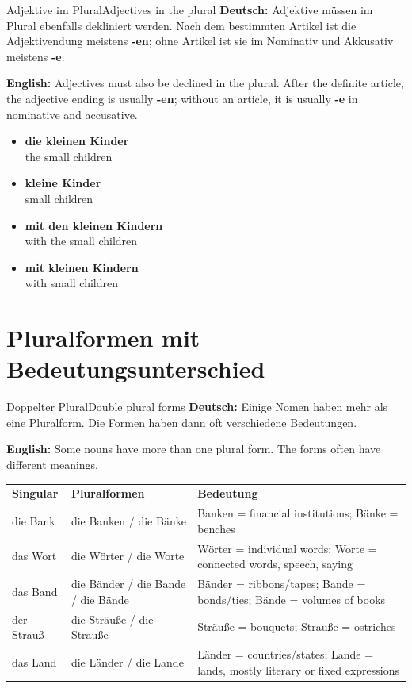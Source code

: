 \documentclass[a4paper,11pt]{article}
\newcommand{\GermanText}[1]{\textbf{Deutsch: }#1\par}
\newcommand{\EnglishText}[1]{{\small\color{SoftGray}\textbf{English: }#1\par}}
\newcommand{\ExampleItem}[2]{\item \textbf{#1}\\{\small\color{SoftGray}#2}}
\newcommand{\TableHead}[3]{\rowcolor{HeaderBlueDark}\color{white}\textbf{#1} & \color{white}\textbf{#2} & \color{white}\textbf{#3}\\}
\begin{document}
\begin{grammarentry}{Adjektive im Plural}{Adjectives in the plural}
\GermanText{Adjektive müssen im Plural ebenfalls dekliniert werden. Nach dem bestimmten Artikel ist die Adjektivendung meistens \textbf{-en}; ohne Artikel ist sie im Nominativ und Akkusativ meistens \textbf{-e}.}
\EnglishText{Adjectives must also be declined in the plural. After the definite article, the adjective ending is usually \textbf{-en}; without an article, it is usually \textbf{-e} in nominative and accusative.}
\begin{exbox}
\begin{itemize}
\ExampleItem{die kleinen Kinder}{the small children}
\ExampleItem{kleine Kinder}{small children}
\ExampleItem{mit den kleinen Kindern}{with the small children}
\ExampleItem{mit kleinen Kindern}{with small children}
\end{itemize}
\end{exbox}
\end{grammarentry}

\section{Pluralformen mit Bedeutungsunterschied}

\begin{grammarentry}{Doppelter Plural}{Double plural forms}
\GermanText{Einige Nomen haben mehr als eine Pluralform. Die Formen haben dann oft verschiedene Bedeutungen.}
\EnglishText{Some nouns have more than one plural form. The forms often have different meanings.}

\begin{longtable}{>{\RaggedRight\arraybackslash}p{}>{\RaggedRight\arraybackslash}p{}>{\RaggedRight\arraybackslash}p{}}
\TableHead{Singular}{Pluralformen}{Bedeutung}
\rowcolor{RowBlueLight} die Bank & die Banken / die Bänke & Banken = financial institutions; Bänke = benches \\
\rowcolor{RowBlueDark} das Wort & die Wörter / die Worte & Wörter = individual words; Worte = connected words, speech, saying \\
\rowcolor{RowBlueLight} das Band & die Bänder / die Bande / die Bände & Bänder = ribbons/tapes; Bande = bonds/ties; Bände = volumes of books \\
\rowcolor{RowBlueDark} der Strauß & die Sträuße / die Strauße & Sträuße = bouquets; Strauße = ostriches \\
\rowcolor{RowBlueLight} das Land & die Länder / die Lande & Länder = countries/states; Lande = lands, mostly literary or fixed expressions \\
\end{longtable}
\end{grammarentry}
\end{document}
